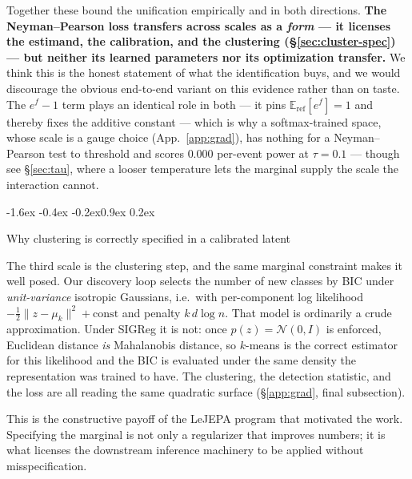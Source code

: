 \documentclass{article}
\makeatletter
\renewcommand\subsection{\@startsection{subsection}{2}{\z@}%
  {-1.6ex \@plus -0.4ex \@minus -0.2ex}{0.9ex \@plus 0.2ex}%
  {\normalsize\bf\raggedright}}
\newcommand{\E}{\mathbb{E}}
\newcommand{\N}{\mathcal{N}}
\makeatother
\begin{document}
Together these bound the unification empirically and in both directions.
\textbf{The Neyman--Pearson loss transfers across scales as a \emph{form} --- it
licenses the estimand, the calibration, and the clustering
(\S\ref{sec:cluster-spec}) --- but neither its learned parameters nor its
optimization transfer.} We think this is the honest statement of what the
identification buys, and we would discourage the obvious end-to-end variant on
this evidence rather than on taste. The $e^{f}-1$ term plays an identical role in both --- it pins
$\E_{\mathrm{ref}}[e^{f}]=1$ and thereby fixes the additive constant --- which
is why a softmax-trained space, whose scale is a gauge choice
(App.~\ref{app:grad}), has nothing for a Neyman--Pearson test to threshold and
scores $0.000$ per-event power at $\tau=0.1$ --- though see \S\ref{sec:tau},
where a looser temperature lets the marginal supply the scale the interaction
cannot.

\subsection{Why clustering is correctly specified in a calibrated latent}
\label{sec:cluster-spec}

The third scale is the clustering step, and the same marginal constraint makes
it well posed. Our discovery loop selects the number of new classes by BIC
under \emph{unit-variance} isotropic Gaussians, i.e.\ with per-component log
likelihood $-\tfrac12\|z-\mu_k\|^2 + \text{const}$ and penalty $k\,d\log n$.
That model is ordinarily a crude approximation. Under SIGReg it is not: once
$p(z)=\N(0,I)$ is enforced, Euclidean distance \emph{is} Mahalanobis distance,
so $k$-means is the correct estimator for this likelihood and the BIC is
evaluated under the same density the representation was trained to have. The
clustering, the detection statistic, and the loss are all reading the same
quadratic surface (\S\ref{app:grad}, final subsection).

This is the constructive payoff of the LeJEPA program that motivated the work.
Specifying the marginal is not only a regularizer that improves numbers; it is
what licenses the downstream inference machinery to be applied without
misspecification.
\end{document}
